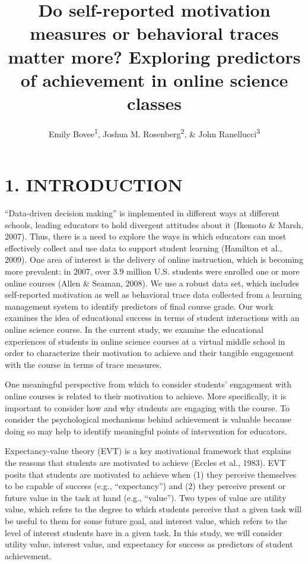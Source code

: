 \documentclass[acmart]{apa6}
\title{Do self-reported motivation measures or behavioral traces matter more?
Exploring predictors of achievement in online science classes}
\author{Emily Bovee\textsuperscript{1}, Joshua M. Rosenberg\textsuperscript{2}, \& John Ranellucci\textsuperscript{3}}
\affiliation{
    \vspace{0.5cm}
          \textsuperscript{1} Michigan State University\\
          \textsuperscript{2} University of Tennessee, Knoxville\\
          \textsuperscript{3} Hunter College  }
\theoremstyle{definition}
\theoremstyle{definition}
\theoremstyle{definition}
\theoremstyle{remark}
\begin{document}
\maketitle

\setcounter{secnumdepth}{0}



\section{1. INTRODUCTION}\label{introduction}

\enquote{Data-driven decision making} is implemented in different ways
at different schools, leading educators to hold divergent attitudes
about it (Ikemoto \& Marsh, 2007). Thus, there is a need to explore the
ways in which educators can most effectively collect and use data to
support student learning (Hamilton et al., 2009). One area of interest
is the delivery of online instruction, which is becoming more prevalent:
in 2007, over 3.9 million U.S. students were enrolled one or more online
courses (Allen \& Seaman, 2008). We use a robust data set, which
includes self-reported motivation as well as behavioral trace data
collected from a learning management system to identify predictors of
final course grade. Our work examines the idea of educational success in
terms of student interactions with an online science course. In the
current study, we examine the educational experiences of students in
online science courses at a virtual middle school in order to
characterize their motivation to achieve and their tangible engagement
with the course in terms of trace measures.

One meaningful perspective from which to consider students' engagement
with online courses is related to their motivation to achieve. More
specifically, it is important to consider how and why students are
engaging with the course. To consider the psychological mechanisms
behind achievement is valuable because doing so may help to identify
meaningful points of intervention for educators.

Expectancy-value theory (EVT) is a key motivational framework that
explains the reasons that students are motivated to achieve (Eccles et
al., 1983). EVT posits that students are motivated to achieve when (1)
they perceive themselves to be capable of success (e.g.,
\enquote{expectancy}) and (2) they perceive present or future value in
the task at hand (e.g., \enquote{value}). Two types of value are utility
value, which refers to the degree to which students perceive that a
given task will be useful to them for some future goal, and interest
value, which refers to the level of interest students have in a given
task. In this study, we will consider utility value, interest value, and
expectancy for success as predictors of student achievement.
\end{document}

